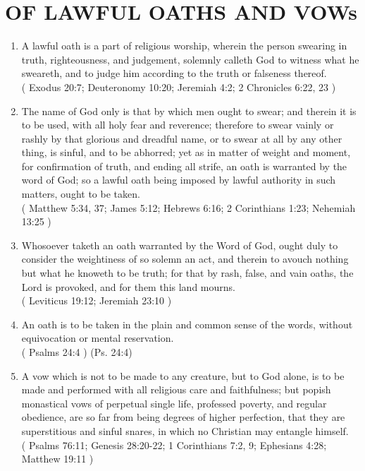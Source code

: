 \documentclass[12pt,a4paper]{book}
\begin{document}
\chapter{OF LAWFUL OATHS AND VOWs}
\label{ch-law-oat-vow}
\begin{enumerate}
\item
\label{ch-law-oat-vow-1}
A lawful oath is a part of religious worship, wherein the person swearing in truth, righteousness, and judgement, solemnly calleth God to witness what he sweareth, and to judge him according to the truth or falseness thereof.\\
( Exodus 20:7; Deuteronomy 10:20; Jeremiah 4:2; 2 Chronicles 6:22, 23 )
\item
\label{ch-law-oat-vow-2}
The name of God only is that by which men ought to swear; and therein it is to be used, with all holy fear and reverence; therefore to swear vainly or rashly by that glorious and dreadful name, or to swear at all by any other thing, is sinful, and to be abhorred; yet as in matter of weight and moment, for confirmation of truth, and ending all strife, an oath is warranted by the word of God; so a lawful oath being imposed by lawful authority in such matters, ought to be taken.\\
( Matthew 5:34, 37; James 5:12; Hebrews 6:16; 2 Corinthians 1:23; Nehemiah 13:25 )
\item
\label{ch-law-oat-vow-3}
Whosoever taketh an oath warranted by the Word of God, ought duly to consider the weightiness of so solemn an act, and therein to avouch nothing but what he knoweth to be truth; for that by rash, false, and vain oaths, the Lord is provoked, and for them this land mourns.\\
( Leviticus 19:12; Jeremiah 23:10 )
\item
\label{ch-law-oat-vow-4}
An oath is to be taken in the plain and common sense of the words, without equivocation or mental reservation.\\
( Psalms 24:4 ) (Ps. 24:4)
\item
\label{ch-law-oat-vow-5}
A vow which is not to be made to any creature, but to God alone, is to be made and performed with all religious care and faithfulness; but popish monastical vows of perpetual single life, professed poverty, and regular obedience, are so far from being degrees of higher perfection, that they are superstitious and sinful snares, in which no Christian may entangle himself.\\
( Psalms 76:11; Genesis 28:20-22; 1 Corinthians 7:2, 9; Ephesians 4:28; Matthew 19:11 )
\end{enumerate}
\end{document}
